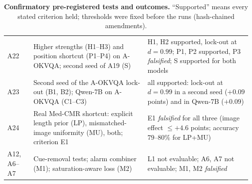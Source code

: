 \begin{table}[t]
\begin{tabular}{@{}l p{} p{}@{}}
    A22 & Higher strengths (H1--H3) and position shortcut (P1--P4) on A-OKVQA; second seed of A19 (S) & H1, H2 supported, lock-out at $d=0.99$; P1, P2 supported, P3 \emph{falsified}; S supported for both models \\
    A23 & Second seed of the A-OKVQA lock-out (B1, B2); Qwen-7B on A-OKVQA (C1--C3) & all supported: lock-out at $d=0.99$ in a second seed ($+0.09$ points) and in Qwen-7B ($+0.09$) \\
    A24 & Real Med-CMR shortcut: explicit length prior (LP), mismatched-image uniformity (MU), both; criterion E1 & E1 \emph{falsified} for all three (image effect $\le+4.6$ points; accuracy $79$--$80\%$ for LP+MU) \\
    A12, A6--A7 & Cue-removal tests; alarm combiner (M1); saturation-aware loss (M2) & L1 not evaluable; A6, A7 not evaluable; M1, M2 \emph{falsified} \\
    \bottomrule
  \end{tabular}
  \caption{\textbf{Confirmatory pre-registered tests and outcomes.} ``Supported'' means every stated criterion held; thresholds were fixed before the runs (hash-chained amendments).}
  \label{tab:prereg}
\end{table}
